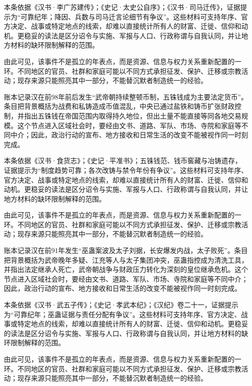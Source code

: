 本条依据《汉书·李广苏建传》；《史记·太史公自序》；《汉书·司马迁传》，证据提示为“可靠纪年；降因、兵数与司马迁言论细节有争议”。这些材料可支持年序、官方决定、战事或特定地点的线索，却难以直接统计所有人的财富、迁徙、信仰和动机。更稳妥的读法是区分诏令与实施、军报与人口、行政称谓与自我认同，并让地方材料的缺环限制解释的范围。

由此可见，该事件不是孤立的年表点，而是资源、信息与权力关系重新配置的一环。不同地区的官员、社群和家庭可能以不同方式承担征发、保护、迁移或宗教活动；现存来源只能照亮其中一部分，不能替沉默者制造统一的经验。

账本记录汉在前98年前后发生“武帝朝持续整顿币制，五铢钱成为主要法定货币”。条目把背景概括为战费和私铸造成币值混乱，中央已通过盐铁和铸币扩张财政控制，并指出五铢钱在帝国范围内取得持久地位，但出土量不能直接等同各地交易规模。这个节点进入区域社会时，要经由文书、道路、军队、市场、寺院和家庭等不同中介；因此，政治行动的宣布、地方接收和日常生活的改变不能被视作同一时刻完成。

本条依据《汉书·食货志》；《史记·平准书》；五铢钱范、钱币窖藏与冶铸遗存，证据提示为“制度趋势可靠；各次改铸与禁令年份有争议”。这些材料可支持年序、官方决定、战事或特定地点的线索，却难以直接统计所有人的财富、迁徙、信仰和动机。更稳妥的读法是区分诏令与实施、军报与人口、行政称谓与自我认同，并让地方材料的缺环限制解释的范围。

由此可见，该事件不是孤立的年表点，而是资源、信息与权力关系重新配置的一环。不同地区的官员、社群和家庭可能以不同方式承担征发、保护、迁移或宗教活动；现存来源只能照亮其中一部分，不能替沉默者制造统一的经验。

账本记录汉在前91年发生“巫蛊案波及太子刘据，长安爆发内战，太子败死”。条目把背景概括为武帝晚年多疑、江充等人与太子集团冲突，巫蛊指控成为清洗工具，并指出法定继承人死亡，武帝朝战争与财政压力转化为深刻的皇位继承危机。这个节点进入区域社会时，要经由文书、道路、军队、市场、寺院和家庭等不同中介；因此，政治行动的宣布、地方接收和日常生活的改变不能被视作同一时刻完成。

本条依据《汉书·武五子传》；《史记·孝武本纪》；《汉纪》卷二十一，证据提示为“可靠纪年；巫蛊证据与责任分配有争议”。这些材料可支持年序、官方决定、战事或特定地点的线索，却难以直接统计所有人的财富、迁徙、信仰和动机。更稳妥的读法是区分诏令与实施、军报与人口、行政称谓与自我认同，并让地方材料的缺环限制解释的范围。

由此可见，该事件不是孤立的年表点，而是资源、信息与权力关系重新配置的一环。不同地区的官员、社群和家庭可能以不同方式承担征发、保护、迁移或宗教活动；现存来源只能照亮其中一部分，不能替沉默者制造统一的经验。

